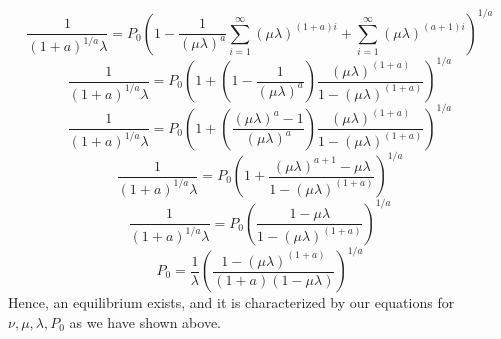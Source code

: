\documentclass[10pt,letter]{article}
\begin{document}
\[  \frac{1}{(1 + a )^{1/a}\lambda } = P_0 \left(  1 - \frac{1}{(\mu\lambda)^a}\sum_{i=1}^{\infty} (\mu\lambda)^{(1+a)i}  + \sum_{i=1}^{\infty}  (\mu\lambda)^{(a+1)i}  \right)^{1/a} \]
\[  \frac{1}{(1 + a )^{1/a}\lambda } = P_0 \left(  1 + \left( 1 - \frac{1}{(\mu\lambda)^a}\right)\frac{(\mu\lambda)^{(1+a)}}{1 - (\mu\lambda)^{(1+a)}} \right)^{1/a} \]
\[  \frac{1}{(1 + a )^{1/a}\lambda } = P_0 \left(  1 + \left(\frac{(\mu\lambda)^a - 1}{(\mu\lambda)^a}\right)\frac{(\mu\lambda)^{(1+a)}}{1 - (\mu\lambda)^{(1+a)}} \right)^{1/a} \]
\[  \frac{1}{(1 + a )^{1/a}\lambda } = P_0 \left(  1 + \frac{(\mu\lambda)^{a+1} - \mu\lambda}{1 - (\mu\lambda)^{(1+a)}} \right)^{1/a} \]
\[  \frac{1}{(1 + a )^{1/a}\lambda } = P_0 \left(  \frac{1 - \mu\lambda}{1 - (\mu\lambda)^{(1+a)}} \right)^{1/a} \]
\[  P_0 =  \frac{1}{\lambda} \left(  \frac{1 - (\mu\lambda)^{(1+a)}} {(1+a)(1 - \mu\lambda)}\right)^{1/a} \]
Hence, an equilibrium exists, and it is characterized by our equations for $\nu, \mu, \lambda, P_0$ as we have shown above.
\end{document}
